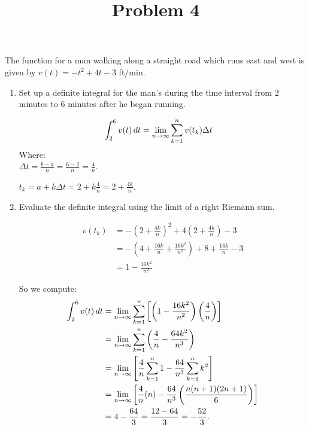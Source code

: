 \documentclass{ximera}
\title[Problem 4]{Problem 4}
\begin{document}
\begin{abstract} \end{abstract}
\maketitle


\begin{problem}
  The  function for a man walking along a straight road which runs east and west is given by $v(t) = -t^2 + 4t - 3$ ft/min.
  \begin{enumerate}
    
  \item  Set up a definite integral for the man's  during the time interval from $2$ minutes to $6$ minutes after he began running.
\begin{explanation}
      \begin{align*}
        \int_2^6 v(t) \,d t &= \lim_{n \to \infty} \sum_{k=1}^n v(t_k) \Delta t
      \end{align*}
      Where:  \\	
      $\Delta t = \frac{b-a}{n} = \frac{6-2}{n} = \frac{4}{n}$.
      
      $t_k = a + k \Delta t = 2 + k \frac{4}{n} = 2 + \frac{4k}{n}$.
    \end{explanation}
    
  \item  {}  Evaluate the definite integral using the limit of a right Riemann sum.
\begin{explanation}
      \begin{align*}
        v(t_k) &= -\left(2 + \frac{4k}{n} \right)^2 + 4 \left( 2 + \frac{4k}{n} \right) - 3  \\
               &= - \left( 4 + \frac{16k}{n} + \frac{16k^2}{n^2} \right) + 8 + \frac{16k}{n} - 3  \\
               &= 1 - \frac{16k^2}{n^2}
      \end{align*}
      
      So we compute:
      \begin{align*}
        \int_2^6 v(t) \,d t &= \lim_{n \to \infty} \sum_{k=1}^n \left[ \left( 1 - \frac{16k^2}{n^2} \right) \left( \frac{4}{n} \right) \right]  \\
                           &= \lim_{n \to \infty} \sum_{k=1}^n \left( \frac{4}{n} - \frac{64 k^2}{n^3} \right)  \\
                           &= \lim_{n \to \infty} \left[ \frac{4}{n} \sum_{k=1}^n 1 - \frac{64}{n^3} \sum_{k=1}^n k^2 \right]  \\
                           &= \lim_{n \to \infty} \left[ \frac{4}{n} (n) - \frac{64}{n^3} \left( \frac{n(n+1)(2n+1)}{6} \right) \right]  \\
                           &= 4 - \frac{64}{3} = \frac{12-64}{3} = - \frac{52}{3}.
      \end{align*}
    \end{explanation}
    

\end{enumerate}
\end{problem}
\end{document}

